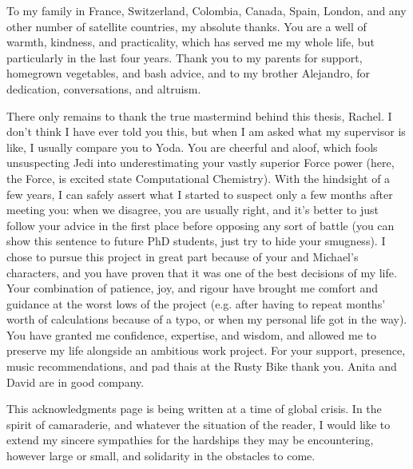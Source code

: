 \documentclass[
11pt, %
english, %
singlespacing, %
headsepline, %
]{MastersDoctoralThesis} %
\begin{document}
\begin{acknowledgements}
To my family in France, Switzerland, Colombia, Canada, Spain, London, and any other number of satellite countries, my absolute thanks. You are a well of warmth, kindness, and practicality, which has served me my whole life, but particularly in the last four years. Thank you to my parents for support, homegrown vegetables, and bash advice, and to my brother Alejandro, for dedication, conversations, and altruism.

There only remains to thank the true mastermind behind this thesis, Rachel. I don’t think I have ever told you this, but when I am asked what my supervisor is like, I usually compare you to Yoda. You are cheerful and aloof, which fools unsuspecting Jedi into underestimating your vastly superior Force power (here, the Force, is excited state Computational Chemistry). With the hindsight of a few years, I can safely assert what I started to suspect only a few months after meeting you: when we disagree, you are usually right, and it’s better to just follow your advice in the first place before opposing any sort of battle (you can show this sentence to future PhD students, just try to hide your smugness). I chose to pursue this project in great part because of your and Michael’s characters, and you have proven that it was one of the best decisions of my life. Your combination of patience, joy, and rigour have brought me comfort and guidance at the worst lows of the project (e.g. after having to repeat months’ worth of calculations because of a typo, or when my personal life got in the way). You have granted me confidence, expertise, and wisdom, and allowed me to preserve my life alongside an ambitious work project. For your support, presence, music recommendations, and pad thais at the Rusty Bike thank you. Anita and David are in good company.

This acknowledgments page is being written at a time of global crisis. In the spirit of camaraderie, and whatever the situation of the reader, I would like to extend my sincere sympathies for the hardships they may be encountering, however large or small, and solidarity in the obstacles to come.

\end{acknowledgements}


\tableofcontents %
\end{document}

